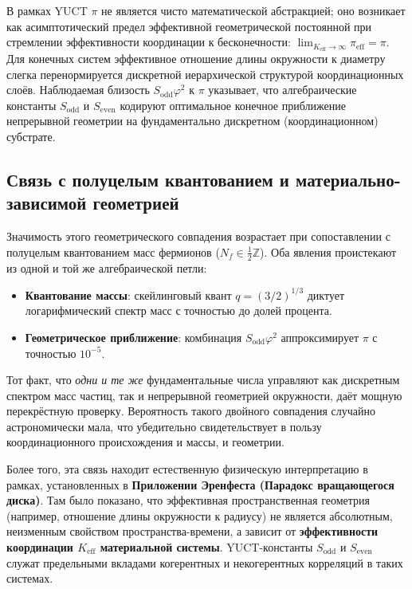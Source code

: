 \documentclass[11pt,a4paper]{article}
\theoremstyle{remark}
\begin{document}
	В рамках YUCT \(\pi\) не является чисто математической абстракцией; оно возникает как асимптотический предел эффективной геометрической постоянной при стремлении эффективности координации к бесконечности: \(\lim_{K_{\mathrm{eff}} \to \infty} \pi_{\mathrm{eff}} = \pi\). Для конечных систем эффективное отношение длины окружности к диаметру слегка перенормируется дискретной иерархической структурой координационных слоёв. Наблюдаемая близость \(S_{\mathrm{odd}}\varphi^2\) к \(\pi\) указывает, что алгебраические константы \(S_{\mathrm{odd}}\) и \(S_{\mathrm{even}}\) кодируют оптимальное конечное приближение непрерывной геометрии на фундаментально дискретном (координационном) субстрате.
	
	\subsection{Связь с полуцелым квантованием и материально-зависимой геометрией}
	
	Значимость этого геометрического совпадения возрастает при сопоставлении с полуцелым квантованием масс фермионов (\(N_f \in \frac{1}{2}\mathbb{Z}\)). Оба явления проистекают из одной и той же алгебраической петли:
	\begin{itemize}
		\item \textbf{Квантование массы}: скейлинговый квант \(q = (3/2)^{1/3}\) диктует логарифмический спектр масс с точностью до долей процента.
		\item \textbf{Геометрическое приближение}: комбинация \(S_{\mathrm{odd}}\varphi^2\) аппроксимирует \(\pi\) с точностью \(10^{-5}\).
	\end{itemize}
	Тот факт, что \emph{одни и те же} фундаментальные числа управляют как дискретным спектром масс частиц, так и непрерывной геометрией окружности, даёт мощную перекрёстную проверку. Вероятность такого двойного совпадения случайно астрономически мала, что убедительно свидетельствует в пользу координационного происхождения и массы, и геометрии.
	
	Более того, эта связь находит естественную физическую интерпретацию в рамках, установленных в \textbf{Приложении Эренфеста (Парадокс вращающегося диска)}. Там было показано, что эффективная пространственная геометрия (например, отношение длины окружности к радиусу) не является абсолютным, неизменным свойством пространства-времени, а зависит от \textbf{эффективности координации \(K_{\mathrm{eff}}\) материальной системы}. YUCT-константы \(S_{\mathrm{odd}}\) и \(S_{\mathrm{even}}\) служат предельными вкладами когерентных и некогерентных корреляций в таких системах. 
	
\end{document}
